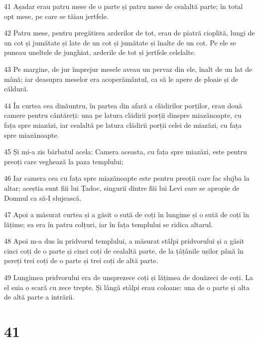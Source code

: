 \par 41 Așadar erau patru mese de o parte și patru mese de cealaltă parte; în total opt mese, pe care se tăiau jertfele.
\par 42 Patru mese, pentru pregătirea arderilor de tot, erau de piatră cioplită, lungi de un cot și jumătate și late de un cot și jumătate și înalte de un cot. Pe ele se puneau uneltele de junghiat, arderile de tot și jertfele celelalte.
\par 43 Pe margine, de jur împrejur mesele aveau un pervaz din ele, înalt de un lat de mână; iar deasupra meselor era acoperământul, ca să le apere de ploaie și de căldură.
\par 44 În curtea cea dinăuntru, în partea din afară a clădirilor porților, erau două camere pentru cântăreți: una pe latura clădirii porții dinspre miazănoapte, cu fața spre miazăzi, iar cealaltă pe latura clădirii porții celei de miazăzi, cu fața spre miazănoapte.
\par 45 Și mi-a zis bărbatul acela: Camera aceasta, cu fața spre miazăzi, este pentru preoți care veghează la paza templului;
\par 46 Iar camera cea cu fața spre miazănoapte este pentru preoții care fac slujba la altar; aceștia sunt fiii lui Țadoc, singurii dintre fiii lui Levi care se apropie de Domnul ca să-I slujească.
\par 47 Apoi a măsurat curtea și a găsit o sută de coți în lungime și o sută de coți în lățime; ea era în patru colțuri, iar în fața templului se ridica altarul.
\par 48 Apoi m-a dus în pridvorul templului, a măsurat stâlpi pridvorului și a găsit cinci coți de o parte și cinci coți de cealaltă parte, de la țâțânile ușilor până în pereți trei coți de o parte și trei coți de altă parte.
\par 49 Lungimea pridvorului era de unsprezece coți și lățimea de douăzeci de coți. La el suia o scară cu zece trepte. Și lângă stâlpi erau coloane: una de o parte și alta de altă parte a intrării.

\chapter{41}


